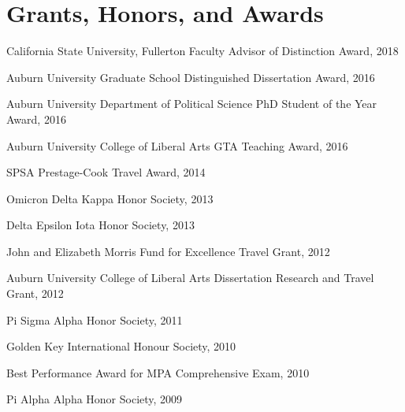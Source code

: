 \documentclass[11pt,letterpaper]{article}
\renewenvironment{itemize}{
  \begin{list}{}{
    \setlength{\leftmargin}{1.5em}
    \setlength{\itemsep}{0.25em}
    \setlength{\parskip}{0pt}
    \setlength{\parsep}{0.25em}
  }
}{
  \end{list}
}
\begin{document}
\section*{Grants, Honors, and Awards}
\begin{itemize}
	\item California State University, Fullerton Faculty Advisor of Distinction Award, 2018
	\item Auburn University Graduate School Distinguished Dissertation Award, 2016
	\item Auburn University Department of Political Science PhD Student of the Year Award, 2016
	\item Auburn University College of Liberal Arts GTA Teaching Award, 2016
	\item SPSA Prestage-Cook Travel Award, 2014
	\item Omicron Delta Kappa Honor Society, 2013
	\item Delta Epsilon Iota Honor Society, 2013
	\item John and Elizabeth Morris Fund for Excellence Travel Grant, 2012
	\item Auburn University College of Liberal Arts Dissertation Research and Travel Grant, 2012
	\item Pi Sigma Alpha Honor Society, 2011
	\item Golden Key International Honour Society, 2010
	\item Best Performance Award for MPA Comprehensive Exam, 2010
	\item Pi Alpha Alpha Honor Society, 2009
\end{itemize}
\end{document}
